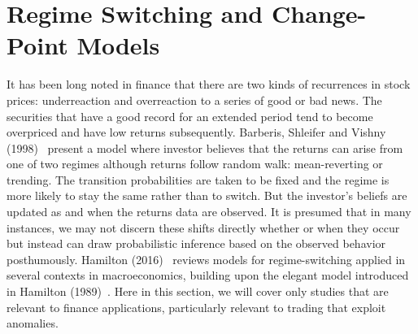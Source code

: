 \section{Regime Switching and Change-Point Models}


It has been long noted in finance that there are two kinds of recurrences in stock prices: underreaction and overreaction to a series of good or bad news. The securities that have a good record for an extended period tend to become overpriced and have low returns subsequently. Barberis, Shleifer and Vishny (1998)~\cite{vishny} present a model where investor believes that the returns can arise from one of two regimes although returns follow random walk: mean-reverting or trending. The transition probabilities are taken to be fixed and the regime is more likely to stay the same rather than to switch. But the investor's beliefs are updated as and when the returns data are observed. It is presumed that in many instances, we may not discern these shifts directly whether or when they occur but instead can draw probabilistic inference based on the observed behavior posthumously. Hamilton (2016)~\cite{jdham} reviews models for regime-switching applied in several contexts in macroeconomics, building upon the elegant model introduced in Hamilton (1989)~\cite{89ham}. Here in this section, we will cover only studies that are relevant to finance applications, particularly relevant to trading that exploit anomalies. 


